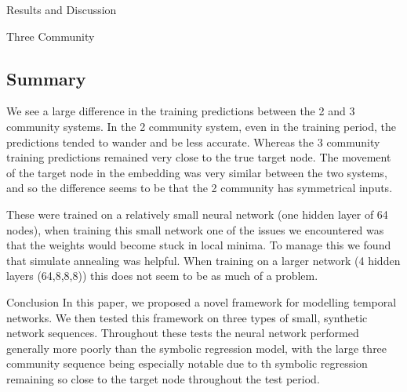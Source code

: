 \documentclass[12pt]{amsart}
\begin{document}
\begin{section}{Results and Discussion}
\begin{subsection}{Three Community}
        \subsection{Summary}
        We see a large difference in the training predictions between the 2 and 3 community systems. In the 2 community system, even in the training period, the predictions tended to wander and be less accurate. Whereas the 3 community training predictions remained very close to the true target node. The movement of the target node in the embedding was very similar between the two systems, and so the difference seems to be that the 2 community has symmetrical inputs.

        These were trained on a relatively small neural network (one hidden layer of 64 nodes), when training this small network one of the issues we encountered was that the weights would become stuck in local minima. To manage this we found that simulate annealing was helpful. When training on a larger network (4 hidden layers (64,8,8,8)) this does not seem to be as much of a problem.
    \end{subsection}

\end{section}

\begin{section}{Conclusion}
    In this paper, we proposed a novel framework for modelling temporal networks. We then tested this framework on three types of small, synthetic network sequences. Throughout these tests the neural network performed generally more poorly than the symbolic regression model, with the large three community sequence being especially notable due to th symbolic regression remaining so close to the target node throughout the test period. 
\end{section} 



\printbibliography
\end{document}
